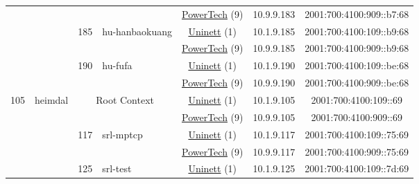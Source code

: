 \begin{small}
\begin{center}
\begin{longtable}{|c|c|c|c|c|c|c|c|}
  &  &  &  & \multicolumn{2}{|c|}{\tiny{\href{http://www.powertech.no}{PowerTech} (9)}} & \tiny{10.9.9.183} & \tiny{2001:700:4100:909::b7:68} \\* \cline{3-3}\cline{4-4}\cline{5-5}\cline{6-6}\cline{7-7}\cline{8-8}
  &  & \multirow{2}{*}{\tiny{185}} & \multicolumn{1}{|l|}{\multirow{2}{*}{\tiny{hu-hanbaokuang}}} & \multicolumn{2}{|c|}{\tiny{\href{https://www.uninett.no}{Uninett} (1)}} & \tiny{10.1.9.185} & \tiny{2001:700:4100:109::b9:68} \\* \cline{5-5}\cline{6-6}\cline{7-7}\cline{8-8}
  &  &  &  & \multicolumn{2}{|c|}{\tiny{\href{http://www.powertech.no}{PowerTech} (9)}} & \tiny{10.9.9.185} & \tiny{2001:700:4100:909::b9:68} \\* \cline{3-3}\cline{4-4}\cline{5-5}\cline{6-6}\cline{7-7}\cline{8-8}
  &  & \multirow{2}{*}{\tiny{190}} & \multicolumn{1}{|l|}{\multirow{2}{*}{\tiny{hu-fufa}}} & \multicolumn{2}{|c|}{\tiny{\href{https://www.uninett.no}{Uninett} (1)}} & \tiny{10.1.9.190} & \tiny{2001:700:4100:109::be:68} \\* \cline{5-5}\cline{6-6}\cline{7-7}\cline{8-8}
  &  &  &  & \multicolumn{2}{|c|}{\tiny{\href{http://www.powertech.no}{PowerTech} (9)}} & \tiny{10.9.9.190} & \tiny{2001:700:4100:909::be:68} \\ \hline
 \multirow{26}{*}{\tiny{105}} & \multicolumn{1}{|l|}{\multirow{26}{*}{\tiny{heimdal}}} & \multicolumn{2}{|c|}{\multirow{2}{*}{\tiny{Root Context}}} & \multicolumn{2}{|c|}{\tiny{\href{https://www.uninett.no}{Uninett} (1)}} & \tiny{10.1.9.105} & \tiny{2001:700:4100:109::69} \\* \cline{5-5}\cline{6-6}\cline{7-7}\cline{8-8}
  &  & \multicolumn{2}{|c|}{} & \multicolumn{2}{|c|}{\tiny{\href{http://www.powertech.no}{PowerTech} (9)}} & \tiny{10.9.9.105} & \tiny{2001:700:4100:909::69} \\* \cline{3-3}\cline{4-4}\cline{5-5}\cline{6-6}\cline{7-7}\cline{8-8}
  &  & \multirow{2}{*}{\tiny{117}} & \multicolumn{1}{|l|}{\multirow{2}{*}{\tiny{srl-mptcp}}} & \multicolumn{2}{|c|}{\tiny{\href{https://www.uninett.no}{Uninett} (1)}} & \tiny{10.1.9.117} & \tiny{2001:700:4100:109::75:69} \\* \cline{5-5}\cline{6-6}\cline{7-7}\cline{8-8}
  &  &  &  & \multicolumn{2}{|c|}{\tiny{\href{http://www.powertech.no}{PowerTech} (9)}} & \tiny{10.9.9.117} & \tiny{2001:700:4100:909::75:69} \\* \cline{3-3}\cline{4-4}\cline{5-5}\cline{6-6}\cline{7-7}\cline{8-8}
  &  & \multirow{2}{*}{\tiny{125}} & \multicolumn{1}{|l|}{\multirow{2}{*}{\tiny{srl-test}}} & \multicolumn{2}{|c|}{\tiny{\href{https://www.uninett.no}{Uninett} (1)}} & \tiny{10.1.9.125} & \tiny{2001:700:4100:109::7d:69} \\* \cline{5-5}\cline{6-6}\cline{7-7}\cline{8-8}

\end{longtable}
\end{center}
\end{small}
